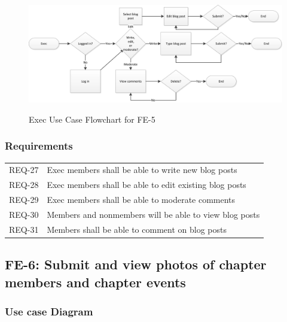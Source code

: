 \documentclass{article}
\newcommand{\req}[1]{REQ-{#1}}
\begin{document}
\newpage

\FloatBarrier
\begin{figure}
\centering
\caption{Exec Use Case Flowchart for FE-5}
\includegraphics[scale=.75]{img/execUseCaseFE5.png}
\label{fig:execUseCaseFE5}
\end{figure}
\FloatBarrier

\newpage

\subsubsection{Requirements}

\begin{tabular}{lp{8cm}}
\req{27} & Exec members shall be able to write new blog posts \\
\req{28} & Exec members shall be able to edit existing blog posts \\
\req{29} & Exec members shall be able to moderate comments \\
\req{30} & Members and nonmembers will be able to view blog posts \\
\req{31} & Members shall be able to comment on blog posts \\
\end{tabular}

\subsection{FE-6: Submit and view photos of chapter members and
  chapter events}

\subsubsection{Use case Diagram}

\newpage
\end{document}
